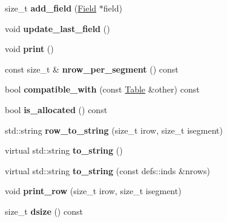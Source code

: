 \begin{DoxyCompactItemize}
\item 
size\+\_\+t {\bfseries add\+\_\+field} (\hyperlink{classField}{Field} $\ast$field)\hypertarget{classTable_a61b74bcfa1a1f6c4e79b3c2579854961}{}\label{classTable_a61b74bcfa1a1f6c4e79b3c2579854961}

\item 
void {\bfseries update\+\_\+last\+\_\+field} ()\hypertarget{classTable_aa2ce71f46592e9be6f7221bc437d78f5}{}\label{classTable_aa2ce71f46592e9be6f7221bc437d78f5}

\item 
void {\bfseries print} ()\hypertarget{classTable_a0de5a9ca880b662ec7d608de686e309a}{}\label{classTable_a0de5a9ca880b662ec7d608de686e309a}

\item 
const size\+\_\+t \& {\bfseries nrow\+\_\+per\+\_\+segment} () const \hypertarget{classTable_a57ea2435e26974ec1aaa08772efc2e5e}{}\label{classTable_a57ea2435e26974ec1aaa08772efc2e5e}

\item 
bool {\bfseries compatible\+\_\+with} (const \hyperlink{classTable}{Table} \&other) const \hypertarget{classTable_a76d23a26905cc9b22f517c46bb388154}{}\label{classTable_a76d23a26905cc9b22f517c46bb388154}

\item 
bool {\bfseries is\+\_\+allocated} () const \hypertarget{classTable_ade2e3f7fc753c742d0157cebd1006216}{}\label{classTable_ade2e3f7fc753c742d0157cebd1006216}

\item 
std\+::string {\bfseries row\+\_\+to\+\_\+string} (size\+\_\+t irow, size\+\_\+t isegment)\hypertarget{classTable_ad08b3c049f18fe78e8558ed6a3a94873}{}\label{classTable_ad08b3c049f18fe78e8558ed6a3a94873}

\item 
virtual std\+::string {\bfseries to\+\_\+string} ()\hypertarget{classTable_ad6ab7c958c808b878cabd61e8df65e9f}{}\label{classTable_ad6ab7c958c808b878cabd61e8df65e9f}

\item 
virtual std\+::string {\bfseries to\+\_\+string} (const defs\+::inds \&nrows)\hypertarget{classTable_a7d8bd3433b4246a185058898632a2071}{}\label{classTable_a7d8bd3433b4246a185058898632a2071}

\item 
void {\bfseries print\+\_\+row} (size\+\_\+t irow, size\+\_\+t isegment)\hypertarget{classTable_ad7833264b3f9885c5477aaf5e97ca508}{}\label{classTable_ad7833264b3f9885c5477aaf5e97ca508}

\item 
size\+\_\+t {\bfseries dsize} () const \hypertarget{classTable_af0e08f84a00fa71c68194858ed58f925}{}\label{classTable_af0e08f84a00fa71c68194858ed58f925}

\end{DoxyCompactItemize}
